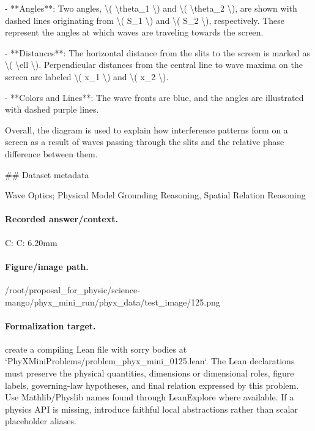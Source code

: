 - **Angles**: Two angles, \textbackslash{}( \textbackslash{}theta\_1 \textbackslash{}) and \textbackslash{}( \textbackslash{}theta\_2 \textbackslash{}), are shown with dashed lines originating from \textbackslash{}( S\_1 \textbackslash{}) and \textbackslash{}( S\_2 \textbackslash{}), respectively. These represent the angles at which waves are traveling towards the screen.

- **Distances**: The horizontal distance from the slits to the screen is marked as \textbackslash{}( \textbackslash{}ell \textbackslash{}). Perpendicular distances from the central line to wave maxima on the screen are labeled \textbackslash{}( x\_1 \textbackslash{}) and \textbackslash{}( x\_2 \textbackslash{}).

- **Colors and Lines**: The wave fronts are blue, and the angles are illustrated with dashed purple lines.

Overall, the diagram is used to explain how interference patterns form on a screen as a result of waves passing through the slits and the relative phase difference between them.

\#\# Dataset metadata

Wave Optics; Physical Model Grounding Reasoning, Spatial Relation Reasoning

\paragraph{Recorded answer/context.}
C: C: 6.20mm

\paragraph{Figure/image path.}
/root/proposal\_for\_physic/science-mango/phyx\_mini\_run/phyx\_data/test\_image/125.png

\paragraph{Formalization target.}
create a compiling Lean file with sorry bodies at `PhyXMiniProblems/problem\_phyx\_mini\_0125.lean`. The Lean declarations must preserve the physical quantities, dimensions or dimensional roles, figure labels, governing-law hypotheses, and final relation expressed by this problem.
Use Mathlib/Physlib names found through LeanExplore where available. If a physics API is missing, introduce faithful local abstractions rather than scalar placeholder aliases.

